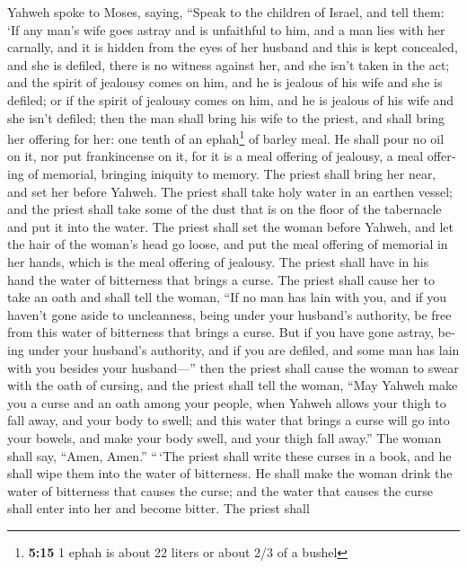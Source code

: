 \begin{paracol}{2}
\begin{otherlanguage}{english}
 Yahweh spoke to Moses, saying,  ``Speak
to the children of Israel, and tell them: `If any man's wife goes astray
and is unfaithful to him,  and a man lies with her
carnally, and it is hidden from the eyes of her husband and this is kept
concealed, and she is defiled, there is no witness against her, and she
isn't taken in the act;  and the spirit of jealousy comes
on him, and he is jealous of his wife and she is defiled; or if the
spirit of jealousy comes on him, and he is jealous of his wife and she
isn't defiled;  then the man shall bring his wife to the
priest, and shall bring her offering for her: one tenth of an
ephah\footnote{\textbf{5:15} 1 ephah is about 22 liters or about 2/3 of
  a bushel} of barley meal. He shall pour no oil on it, nor put
frankincense on it, for it is a meal offering of jealousy, a meal
offering of memorial, bringing iniquity to memory.  The
priest shall bring her near, and set her before Yahweh. 
The priest shall take holy water in an earthen vessel; and the priest
shall take some of the dust that is on the floor of the tabernacle and
put it into the water.  The priest shall set the woman
before Yahweh, and let the hair of the woman's head go loose, and put
the meal offering of memorial in her hands, which is the meal offering
of jealousy. The priest shall have in his hand the water of bitterness
that brings a curse.  The priest shall cause her to take
an oath and shall tell the woman, ``If no man has lain with you, and if
you haven't gone aside to uncleanness, being under your husband's
authority, be free from this water of bitterness that brings a curse.
 But if you have gone astray, being under your husband's
authority, and if you are defiled, and some man has lain with you
besides your husband---''  then the priest shall cause
the woman to swear with the oath of cursing, and the priest shall tell
the woman, ``May Yahweh make you a curse and an oath among your people,
when Yahweh allows your thigh to fall away, and your body to swell;
 and this water that brings a curse will go into your
bowels, and make your body swell, and your thigh fall away.'' The woman
shall say, ``Amen, Amen.''  ``\,`The priest shall write
these curses in a book, and he shall wipe them into the water of
bitterness.  He shall make the woman drink the water of
bitterness that causes the curse; and the water that causes the curse
shall enter into her and become bitter.  The priest shall

\end{otherlanguage}
\end{paracol}
